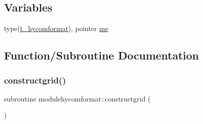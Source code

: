 \subsection*{Variables}
\begin{DoxyCompactItemize}
\item 
type(\mbox{\hyperlink{structmodulehycomformat_1_1t__hycomformat}{t\+\_\+hycomformat}}), pointer \mbox{\hyperlink{namespacemodulehycomformat_aa2b991be0844db8ecd1a671df3bdf8f2}{me}}
\end{DoxyCompactItemize}


\subsection{Function/\+Subroutine Documentation}
\mbox{\label{namespacemodulehycomformat_a9517a6d8966a57eda71abf77acd790cb}} 
\subsubsection{\texorpdfstring{constructgrid()}{constructgrid()}}
{\footnotesize\ttfamily subroutine modulehycomformat\+::constructgrid (\begin{DoxyParamCaption}{ }\end{DoxyParamCaption})\hspace{0.3cm}{\ttfamily [private]}}

